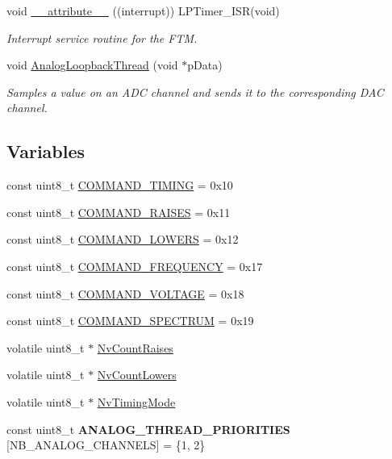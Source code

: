 \begin{DoxyCompactItemize}
\item 
void \hyperlink{group__main__module_gae3cf366e06ba6a7a895b06f7cd6dab35}{\+\_\+\+\_\+attribute\+\_\+\+\_\+} ((interrupt)) L\+P\+Timer\+\_\+\+I\+S\+R(void)
\begin{DoxyCompactList}\small\item\em Interrupt service routine for the F\+T\+M. \end{DoxyCompactList}\item 
void \hyperlink{group__main__module_ga57d918b99919e3a8dd4e1b736370015a}{Analog\+Loopback\+Thread} (void $\ast$p\+Data)
\begin{DoxyCompactList}\small\item\em Samples a value on an A\+D\+C channel and sends it to the corresponding D\+A\+C channel. \end{DoxyCompactList}\end{DoxyCompactItemize}
\subsection*{Variables}
\begin{DoxyCompactItemize}
\item 
const uint8\+\_\+t \hyperlink{group__main__module_gab8928c10e70b1b264be7ff2809bdbafc}{C\+O\+M\+M\+A\+N\+D\+\_\+\+T\+I\+M\+I\+N\+G} = 0x10
\item 
const uint8\+\_\+t \hyperlink{group__main__module_ga458112a297f29bcedf862af9fee21352}{C\+O\+M\+M\+A\+N\+D\+\_\+\+R\+A\+I\+S\+E\+S} = 0x11
\item 
const uint8\+\_\+t \hyperlink{group__main__module_ga3950ac4d5a4f4c540f6856a4ad463e14}{C\+O\+M\+M\+A\+N\+D\+\_\+\+L\+O\+W\+E\+R\+S} = 0x12
\item 
const uint8\+\_\+t \hyperlink{group__main__module_gad03f9b44ebc48c9db63337935fcaf46e}{C\+O\+M\+M\+A\+N\+D\+\_\+\+F\+R\+E\+Q\+U\+E\+N\+C\+Y} = 0x17
\item 
const uint8\+\_\+t \hyperlink{group__main__module_ga793f5eac55477efb909e878b3021f765}{C\+O\+M\+M\+A\+N\+D\+\_\+\+V\+O\+L\+T\+A\+G\+E} = 0x18
\item 
const uint8\+\_\+t \hyperlink{group__main__module_gae55bd8263a510b359f8b4ebca3e6a91d}{C\+O\+M\+M\+A\+N\+D\+\_\+\+S\+P\+E\+C\+T\+R\+U\+M} = 0x19
\item 
volatile uint8\+\_\+t $\ast$ \hyperlink{group__main__module_ga515a64111062904ebde3d38b51d1d7d2}{Nv\+Count\+Raises}
\item 
volatile uint8\+\_\+t $\ast$ \hyperlink{group__main__module_ga5f7c64789a946f4a8d7c20e94b875f30}{Nv\+Count\+Lowers}
\item 
volatile uint8\+\_\+t $\ast$ \hyperlink{group__main__module_ga56dcc37aec297d091908aa8c6c90a89e}{Nv\+Timing\+Mode}
\item 
\hypertarget{group__main__module_ga8916636821cdde434ff4869a5d9ef1b7}{}const uint8\+\_\+t {\bfseries A\+N\+A\+L\+O\+G\+\_\+\+T\+H\+R\+E\+A\+D\+\_\+\+P\+R\+I\+O\+R\+I\+T\+I\+E\+S} \mbox{[}N\+B\+\_\+\+A\+N\+A\+L\+O\+G\+\_\+\+C\+H\+A\+N\+N\+E\+L\+S\mbox{]} = \{1, 2\}\label{group__main__module_ga8916636821cdde434ff4869a5d9ef1b7}

\end{DoxyCompactItemize}


